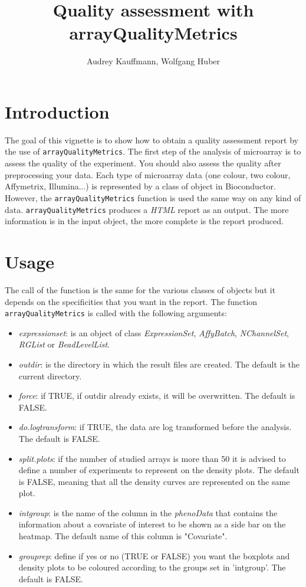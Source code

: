 \documentclass[a4paper]{article}
\newcommand{\Rclass}[1]{\textit{#1}}
\newcommand{\Rfunction}[1]{{\small\texttt{#1}}}
\begin{document}
\title{Quality assessment with arrayQualityMetrics}
\author{Audrey Kauffmann, Wolfgang Huber}
\maketitle
\tableofcontents
\pagebreak

\section*{Introduction}
The goal of this vignette is to show how to obtain a quality assessment report by the use of \Rfunction{arrayQualityMetrics}. The first step of the analysis of microarray is to assess the quality of the experiment. You should also assess the quality after preprocessing your data. Each type of microarray data (one colour, two colour, Affymetrix, Illumina...) is represented by a class of object in Bioconductor. However, the \Rfunction{arrayQualityMetrics} function is used the same way on any kind of data. \Rfunction{arrayQualityMetrics} produces a \emph{HTML} report as an output. The more information is in the input object, the more complete is the report produced.

\section{Usage}

The call of the function is the same for the various classes of objects but it depends on the specificities that you want in the report.
The function \Rfunction{arrayQualityMetrics} is called with the following arguments:
\begin{itemize}
\item \emph{expressionset}: is an object of class \Rclass{ExpressionSet}, 
\Rclass{AffyBatch}, \Rclass{NChannelSet}, \Rclass{RGList} or \Rclass{BeadLevelList}.
\item \emph{outdir}: is the directory in which the result files
    are created. The default is the current directory.
\item \emph{force}: if TRUE, if outdir already exists, it will be overwritten. The default is FALSE.
\item \emph{do.logtransform}: if TRUE, the data are log transformed before the analysis. The default is FALSE.
\item \emph{split.plots}: if the number of studied arrays is more than 50 it is 
advised to define a number of experiments to represent on the density plots. The default is FALSE, meaning that all the density curves are represented on the same plot.
\item \emph{intgroup}: is the name of the column in the \Rclass{phenoData} that contains the information about a covariate of interest to be shown as a side bar on the heatmap. The default name of this column is "Covariate".
\item \emph{grouprep}: define if yes or no (TRUE or FALSE) you want the boxplots and density plots to be coloured according to the groups set in 'intgroup'. The default is FALSE.

\end{itemize}
\end{document}
